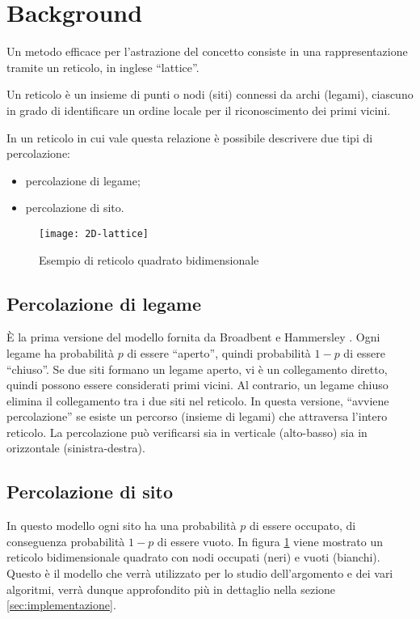 \section{Background}
\label{sec:background}

Un metodo efficace per l'astrazione del concetto consiste 
in una rappresentazione tramite un reticolo, in inglese ``lattice''.

\begin{definition}[Reticolo]
    Un reticolo è un insieme di punti o nodi (siti) connessi da archi (legami), 
    ciascuno in grado di identificare un ordine locale per il riconoscimento dei primi vicini.
\end{definition}

In un reticolo in cui vale questa relazione è possibile descrivere due tipi di percolazione: 
\begin{itemize}
    \item percolazione di legame;
    \item percolazione di sito.
\end{itemize}

\begin{figure}
    \centering
    \texttt{[image: 2D-lattice]}
    \caption{Esempio di reticolo quadrato bidimensionale}
    \label{fig:ex-lattice}
\end{figure}

\subsection*{Percolazione di legame}
È la prima versione del modello fornita da Broadbent e Hammersley \cite{broadbent}.
Ogni legame ha probabilità $p$ di essere ``aperto'', quindi
probabilità $1-p$ di essere ``chiuso''. Se due siti formano un legame aperto, vi è un 
collegamento diretto, quindi possono essere considerati primi vicini. Al contrario, un 
legame chiuso elimina il collegamento tra i due siti nel reticolo.
In questa versione, ``avviene percolazione'' se esiste un percorso (insieme di legami) 
che attraversa l'intero reticolo. La percolazione può verificarsi 
sia in verticale (alto-basso) sia in orizzontale (sinistra-destra).

\subsection*{Percolazione di sito}
In questo modello ogni sito ha una probabilità $p$ di essere occupato, di conseguenza
probabilità $1-p$ di essere vuoto. In figura \ref{fig:ex-lattice} viene mostrato un 
reticolo bidimensionale quadrato con nodi occupati (neri) e vuoti (bianchi). Questo è 
il modello che verrà utilizzato per lo studio dell'argomento e dei vari algoritmi, verrà
dunque approfondito più in dettaglio nella sezione \ref{sec:implementazione}.

